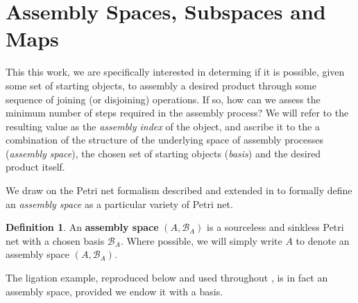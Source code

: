 \documentclass[aps,prd,onecolumn,nofootinbib,letterpaper,preprintnumbers,superscriptaddress,eqsecnum]{revtex4}
\theoremstyle{definition}
\newtheorem{definition}{Definition}
\newcommand{\B}{\mathcal{B}}
\begin{document}
\section{Assembly Spaces, Subspaces and Maps}\label{sec:assembly-spaces}

This this work, we are specifically interested in determing if it is possible, given some set of starting objects, to assembly a desired product through some sequence of joining (or disjoining) operations.
If so, how can we assess the minimum number of steps required in the assembly process?
We will refer to the resulting value as the \textit{assembly index} of the object, and ascribe it to the a combination of the structure of the underlying space of assembly processes (\textit{assembly space}), the chosen set of starting objects (\textit{basis}) and the desired product itself.

We draw on the Petri net formalism described and extended in  to formally define an \textit{assembly space} as a particular variety of Petri net.

\begin{definition}\label{def:assembly-space}
    An \textbf{assembly space} $(A, \B_A)$ is a sourceless and sinkless Petri net with a chosen basis $\B_A$.
    Where possible, we will simply write $A$ to denote an assembly space $(A, \B_A)$.
\end{definition}

The ligation example, reproduced below and used throughout , is in fact an assembly space, provided we endow it with a basis.
\end{document}

